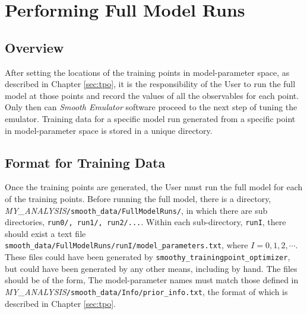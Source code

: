 \documentclass[UserManual.tex]{subfiles}
\begin{document}
\section{Performing Full Model Runs}\label{sec:fullmodel}

\subsection{Overview}

After setting the locations of the training points in model-parameter space, as described in Chapter \ref{sec:tpo}, it is the responsibility of the User to run the full model at those points and record the values of all the observables for each point. Only then can {\it Smooth Emulator} software proceed to the next step of tuning the emulator. Training data for a specific model run generated from a specific point in model-parameter space is stored in a unique directory. 

\subsection{Format for Training Data}

Once the training points are generated, the User must run the full model for each of the training points. Before running the full model, there is a directory, \textit{MY\_ANALYSIS}{\tt /smooth\_data/FullModelRuns/}, in which there are sub directories, {\tt run0/, run1/, run2/...}.  Within each sub-directory, {\tt runI}, there should exist a text file {\tt smooth\_data/FullModelRuns/runI/model\_parameters.txt}, where $I=0,1,2,\cdots$. These files could have been generated by {\tt smoothy\_trainingpoint\_optimizer}, but could have been generated by any other means, including by hand. The files should be of the form,
\vspace*{-8pt}{\tt \begin{Verbatim}[commandchars=\\\{\}]
parameter_name_1  x1
parameter_name_2  x2
parameter_name_3  x3
.
\end{Verbatim}
}\vspace*{-8pt}
The model-parameter names must match those defined in \\\textit{MY\_ANALYSIS}{\tt /smooth\_data/Info/prior\_info.txt}, the format of which is described in Chapter \ref{sec:tpo}. 
\end{document}
